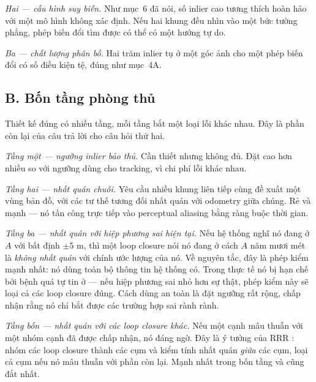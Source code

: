 \documentclass[../../vslam.tex]{subfiles}
\begin{document}
\emph{Hai --- cấu hình suy biến.} Như  mục~6 đã nói, số inlier cao tương thích hoàn hảo với một mô hình không xác định. Nếu hai khung đều nhìn vào một bức tường phẳng, phép biến đổi tìm được có thể có một hướng tự do.

\emph{Ba --- chất lượng phân bố.} Hai trăm inlier tụ ở một góc ảnh cho một phép biến đổi có số điều kiện tệ, đúng như  mục~4A.

\subsection{B. Bốn tầng phòng thủ}

Thiết kế đúng có nhiều tầng, mỗi tầng bắt một loại lỗi khác nhau. Đây là phần còn lại của câu trả lời cho câu hỏi thứ hai.

\emph{Tầng một --- ngưỡng inlier bảo thủ.} Cần thiết nhưng không đủ. Đặt cao hơn nhiều so với ngưỡng dùng cho tracking, vì chi phí lỗi khác nhau.

\emph{Tầng hai --- nhất quán chuỗi.} Yêu cầu nhiều khung liên tiếp cùng đề xuất một vùng bản đồ, với các tư thế tương đối nhất quán với odometry giữa chúng. Rẻ và mạnh --- nó tấn công trực tiếp vào perceptual aliasing bằng ràng buộc thời gian.

\emph{Tầng ba --- nhất quán với hiệp phương sai hiện tại.} Nếu hệ thống nghĩ nó đang ở \(A\) với bất định \(\pm 5\) m, thì một loop closure nói nó đang ở cách \(A\) năm mươi mét là \emph{không nhất quán} với chính ước lượng của nó. Về nguyên tắc, đây là phép kiểm mạnh nhất: nó dùng toàn bộ thông tin hệ thống có. Trong thực tế nó bị hạn chế bởi bệnh quá tự tin ở  --- nếu hiệp phương sai nhỏ hơn sự thật, phép kiểm này sẽ loại cả các loop closure đúng. Cách dùng an toàn là đặt ngưỡng rất rộng, chấp nhận rằng nó chỉ bắt được các trường hợp sai rành rành.

\emph{Tầng bốn --- nhất quán với các loop closure khác.} Nếu một cạnh mâu thuẫn với một nhóm cạnh đã được chấp nhận, nó đáng ngờ. Đây là ý tưởng của RRR \cite{latif2013rrr}: nhóm các loop closure thành các cụm và kiểm tính nhất quán \emph{giữa} các cụm, loại cả cụm nếu nó mâu thuẫn với phần còn lại. Mạnh nhất trong bốn tầng và cũng đắt nhất.
\end{document}
